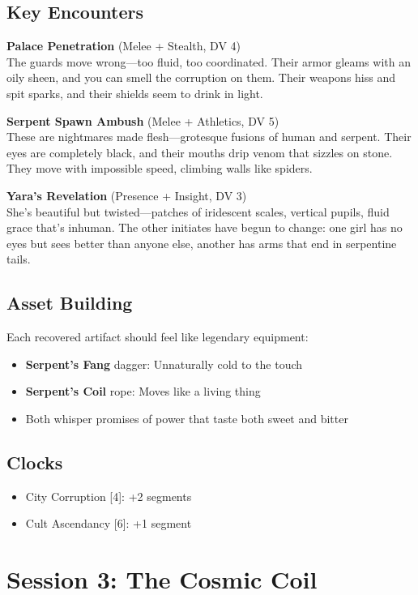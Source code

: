 \documentclass[11pt]{article}
\begin{document}
\subsection*{Key Encounters}

\textbf{Palace Penetration} (Melee + Stealth, DV 4)\\
The guards move wrong—too fluid, too coordinated. Their armor gleams with an oily sheen, and you can smell the corruption on them. Their weapons hiss and spit sparks, and their shields seem to drink in light.

\textbf{Serpent Spawn Ambush} (Melee + Athletics, DV 5)\\
These are nightmares made flesh—grotesque fusions of human and serpent. Their eyes are completely black, and their mouths drip venom that sizzles on stone. They move with impossible speed, climbing walls like spiders.

\textbf{Yara's Revelation} (Presence + Insight, DV 3)\\
She's beautiful but twisted—patches of iridescent scales, vertical pupils, fluid grace that's inhuman. The other initiates have begun to change: one girl has no eyes but sees better than anyone else, another has arms that end in serpentine tails.

\subsection*{Asset Building}
Each recovered artifact should feel like legendary equipment:
\begin{itemize}
    \item \textbf{Serpent's Fang} dagger: Unnaturally cold to the touch
    \item \textbf{Serpent's Coil} rope: Moves like a living thing
    \item Both whisper promises of power that taste both sweet and bitter
\end{itemize}

\subsection*{Clocks}
\begin{itemize}
    \item City Corruption [4]: +2 segments
    \item Cult Ascendancy [6]: +1 segment
\end{itemize}

\section{Session 3: The Cosmic Coil}
\end{document}
